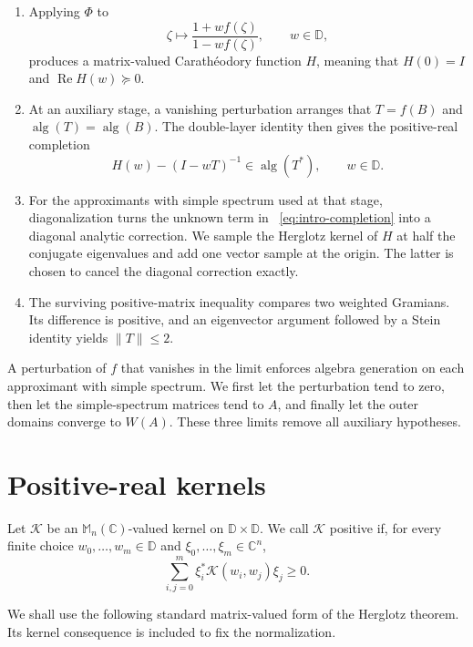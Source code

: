 \documentclass{aomart}
\theoremstyle{definition}
\newcommand{\C}{\mathbb C}
\newcommand{\D}{\mathbb D}
\newcommand{\Mn}{\mathbb M_n(\C)}
\newcommand{\alg}{\operatorname{alg}}
\newcommand{\RePart}{\operatorname{Re}}
\begin{document}
\begin{enumerate}
\item Applying $\Phi$ to
\[
  \zeta\longmapsto\frac{1+w f(\zeta)}{1-w f(\zeta)},
  \qquad w\in\D,
\]
produces a matrix-valued Carath\'eodory function $H$, meaning that
$H(0)=I$ and $\RePart H(w)\succeq0$.

\item At an auxiliary stage, a vanishing perturbation arranges that
$T=f(B)$ and $\alg(T)=\alg(B)$.  The double-layer identity then gives
the positive-real completion
\begin{equation}
  H(w)-(I-wT)^{-1}\in\alg(T^*),\qquad w\in\D.
  \label{eq:intro-completion}
\end{equation}

\item For the approximants with simple spectrum used at that stage,
diagonalization turns the unknown term in~%
\eqref{eq:intro-completion} into a diagonal analytic correction.  We
sample the Herglotz kernel of $H$ at half the conjugate eigenvalues and
add one vector sample at the origin.  The latter is chosen to cancel
the diagonal correction exactly.

\item The surviving positive-matrix inequality compares two weighted
Gramians.  Its difference is positive, and an eigenvector argument
followed by a Stein identity yields $\lVert T\rVert\leq2$.
\end{enumerate}

A perturbation of $f$ that vanishes in the limit enforces algebra
generation on each approximant with simple spectrum.  We first let the
perturbation tend to zero, then let the simple-spectrum matrices tend to
$A$, and finally let the outer domains converge to $W(A)$.  These three
limits remove all auxiliary hypotheses.

\section{Positive-real kernels}
\label{sec:herglotz}

Let $\mathcal K$ be an $\Mn$-valued kernel on $\D\times\D$.  We call
$\mathcal K$ positive if, for every finite choice
$w_0,\ldots,w_m\in\D$ and $\xi_0,\ldots,\xi_m\in\C^n$,
\begin{equation}
  \sum_{i,j=0}^m
  \xi_i^*\mathcal K(w_i,w_j)\xi_j\geq0.
  \label{eq:positive-kernel-definition}
\end{equation}

We shall use the following standard matrix-valued form of the Herglotz
theorem.  Its kernel consequence is included to fix the normalization.
\end{document}
